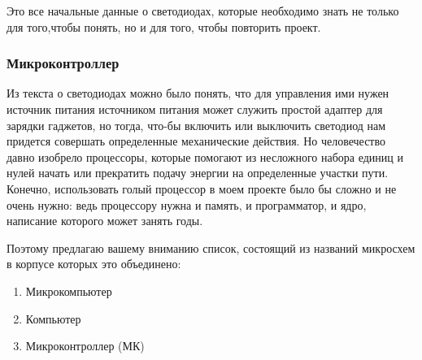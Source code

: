 \documentclass[a4paper, 12pt]{article}
\begin{document}
Это все начальные данные о светодиодах, которые необходимо знать не только для
того,чтобы понять, но и для того, чтобы повторить проект.

\subsubsection{Микроконтроллер}

Из текста о светодиодах можно было понять, что для управления ими нужен
источник питания источником питания может служить простой адаптер для зарядки
гаджетов, но тогда, что-бы включить или выключить светодиод нам придется
совершать определенные механические действия. Но человечество давно изобрело
процессоры, которые помогают из несложного набора единиц и нулей начать или
прекратить подачу энергии на определенные участки пути. Конечно, использовать
голый процессор в моем проекте было бы сложно и не очень нужно: ведь процессору
нужна и память, и программатор, и ядро, написание которого может занять годы.

Поэтому предлагаю вашему вниманию список, состоящий из названий микросхем в
корпусе которых это объединено:

\begin{enumerate}
  \item   Микрокомпьютер
  \item   Компьютер
  \item   Микроконтроллер (МК)
\end{enumerate}
\end{document}
